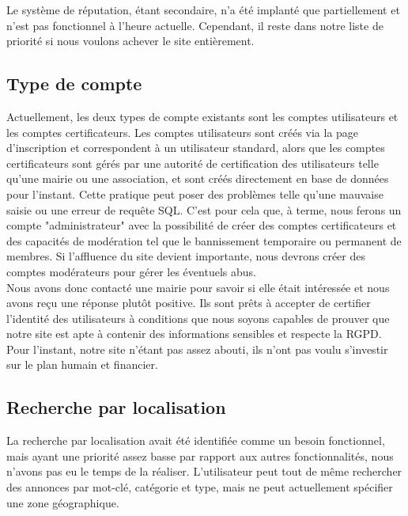 \documentclass[a4paper,11pt]{article}
\begin{document}
Le système de réputation, étant secondaire, n'a été implanté que partiellement et n'est pas fonctionnel à l'heure actuelle. Cependant, il reste dans notre liste de priorité si nous voulons achever le site entièrement.



\subsection{Type de compte}

Actuellement, les deux types de compte existants sont les comptes utilisateurs et les comptes certificateurs. Les comptes utilisateurs sont créés via la page d'inscription et correspondent à un utilisateur standard, alors que les comptes certificateurs sont gérés par une autorité de certification des utilisateurs telle qu'une mairie ou une association, et sont créés directement en base de données pour l'instant. Cette pratique peut poser des problèmes telle qu'une mauvaise saisie ou une erreur de requête SQL. C'est pour cela que, à terme, nous ferons un compte "administrateur" avec la possibilité de créer des comptes certificateurs et des capacités de modération tel que le bannissement temporaire ou permanent de membres.
Si l'affluence du site devient importante, nous devrons créer des comptes modérateurs pour gérer les éventuels abus.\\

Nous avons donc contacté une mairie pour savoir si elle était intéressée et nous avons reçu une réponse plutôt positive. Ils sont prêts à accepter de certifier l'identité des utilisateurs à conditions que nous soyons capables de prouver que notre site est apte à contenir des informations sensibles et respecte la RGPD. Pour l'instant, notre site n'étant pas assez abouti, ils n'ont pas voulu s'investir sur le plan humain et financier.

\subsection{Recherche par localisation}
La recherche par localisation avait été identifiée comme un besoin fonctionnel,
mais ayant une priorité assez basse par rapport aux autres fonctionnalités, nous n'avons
pas eu le temps de la réaliser. L'utilisateur peut tout de même rechercher des annonces par mot-clé,
catégorie et type, mais ne peut actuellement spécifier une zone géographique.
\end{document}
